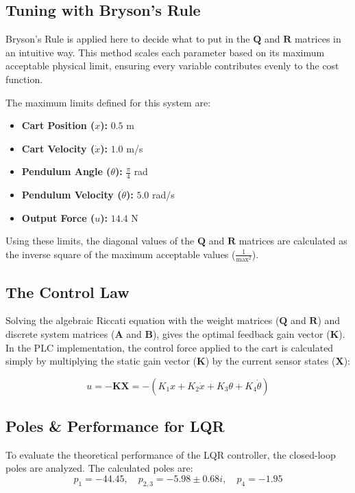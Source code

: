\subsection{Tuning with Bryson's Rule}
Bryson's Rule is applied here to decide what to put in the $\textbf{Q}$ and $\textbf{R}$ matrices in an intuitive way. This method scales each parameter based on its maximum acceptable physical limit, ensuring every variable contributes evenly to the cost function.

\newpage

The maximum limits defined for this system are:
\begin{itemize}[noitemsep]
	\item \textbf{Cart Position ($x$):} $0.5$ m
	\item \textbf{Cart Velocity ($\dot{x}$):} $1.0$ m/s
	\item \textbf{Pendulum Angle ($\theta$):} $\frac{\pi}{4}$ rad
	\item \textbf{Pendulum Velocity ($\dot{\theta}$):} $5.0$ rad/s
	\item \textbf{Output Force ($u$):} $14.4$ N
\end{itemize}

Using these limits, the diagonal values of the $\textbf{Q}$ and $\textbf{R}$ matrices are calculated as the inverse square of the maximum acceptable values ($\frac{1}{\text{max}^2}$).

\subsection{The Control Law}
Solving the algebraic Riccati equation with the weight matrices ($\textbf{Q}$ and $\textbf{R}$) and discrete system matrices ($\textbf{A}$ and $\textbf{B}$), gives the optimal feedback gain vector ($\textbf{K}$). In the PLC implementation, the control force applied to the cart is calculated simply by multiplying the static gain vector ($\textbf{K}$) by the current sensor states ($\textbf{X}$):

\begin{equation}
	\label{LQR control law}
	u = -\textbf{K} \textbf{X} = -(K_1 x + K_2 \dot{x} + K_3 \theta + K_4 \dot{\theta})
\end{equation}

\subsection{Poles \& Performance for LQR} \label{Performance LQR}
To evaluate the theoretical performance of the LQR controller, the closed-loop poles are analyzed. The calculated poles are:
\begin{equation}
	p_1 = -44.45, \quad p_{2,3} = -5.98 \pm 0.68i, \quad p_4 = -1.95
\end{equation}


